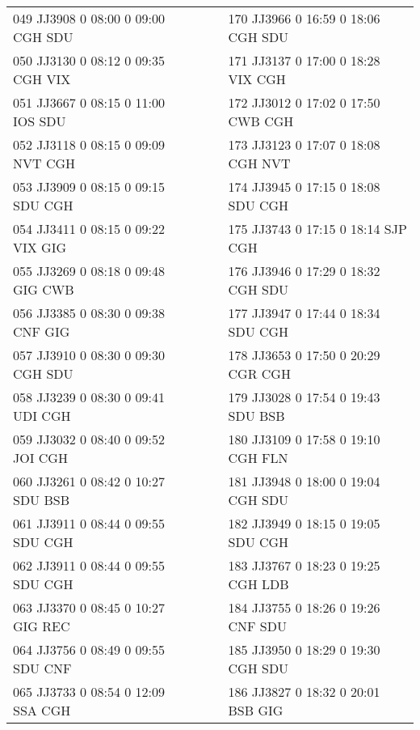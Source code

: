 \begin{scriptsize}
\begin{longtable}{l c c l}
049 JJ3908 0 08:00 0 09:00 CGH SDU & & & 170 JJ3966 0 16:59 0 18:06 CGH SDU \\

050 JJ3130 0 08:12 0 09:35 CGH VIX & & & 171 JJ3137 0 17:00 0 18:28 VIX CGH \\

051 JJ3667 0 08:15 0 11:00 IOS SDU & & & 172 JJ3012 0 17:02 0 17:50 CWB CGH \\

052 JJ3118 0 08:15 0 09:09 NVT CGH & & & 173 JJ3123 0 17:07 0 18:08 CGH NVT \\

053 JJ3909 0 08:15 0 09:15 SDU CGH & & & 174 JJ3945 0 17:15 0 18:08 SDU CGH \\

054 JJ3411 0 08:15 0 09:22 VIX GIG & & & 175 JJ3743 0 17:15 0 18:14 SJP CGH \\

055 JJ3269 0 08:18 0 09:48 GIG CWB & & & 176 JJ3946 0 17:29 0 18:32 CGH SDU \\

056 JJ3385 0 08:30 0 09:38 CNF GIG & & & 177 JJ3947 0 17:44 0 18:34 SDU CGH \\

057 JJ3910 0 08:30 0 09:30 CGH SDU & & & 178 JJ3653 0 17:50 0 20:29 CGR CGH \\

058 JJ3239 0 08:30 0 09:41 UDI CGH & & & 179 JJ3028 0 17:54 0 19:43 SDU BSB \\

059 JJ3032 0 08:40 0 09:52 JOI CGH & & & 180 JJ3109 0 17:58 0 19:10 CGH FLN \\

060 JJ3261 0 08:42 0 10:27 SDU BSB & & & 181 JJ3948 0 18:00 0 19:04 CGH SDU \\

061 JJ3911 0 08:44 0 09:55 SDU CGH & & & 182 JJ3949 0 18:15 0 19:05 SDU CGH \\

062 JJ3911 0 08:44 0 09:55 SDU CGH & & & 183 JJ3767 0 18:23 0 19:25 CGH LDB \\

063 JJ3370 0 08:45 0 10:27 GIG REC & & & 184 JJ3755 0 18:26 0 19:26 CNF SDU \\

064 JJ3756 0 08:49 0 09:55 SDU CNF & & & 185 JJ3950 0 18:29 0 19:30 CGH SDU \\

065 JJ3733 0 08:54 0 12:09 SSA CGH & & & 186 JJ3827 0 18:32 0 20:01 BSB GIG \\


\end{longtable}
\end{scriptsize}
